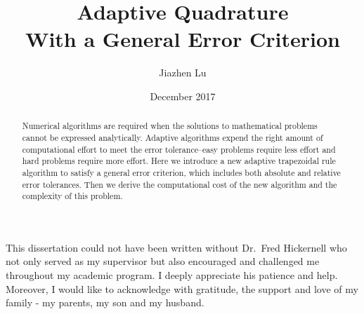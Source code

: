 \documentclass{iitthesis}
\begin{document}
\title{Adaptive Quadrature\\
  With a General Error Criterion}
\author{Jiazhen Lu}
\date{December 2017}
\maketitle                


\prelimpages         


\begin{acknowledgement}    
\par  This dissertation could not have been written without Dr.\  Fred Hickernell who not only served as my supervisor but also encouraged and challenged me throughout my academic program. I deeply appreciate his patience and help. Moreover, I would like to acknowledge with gratitude, the support and love of my family - my parents, my son and my husband. 
\end{acknowledgement}


\tableofcontents
\clearpage

\listoftables

\clearpage

\listoffigures

\clearpage






\begin{abstract}           %

Numerical algorithms are required when the solutions to mathematical problems cannot be expressed analytically. Adaptive algorithms expend the right amount of computational effort to meet the error tolerance--easy problems require less effort and hard problems require more effort. Here we introduce a new adaptive trapezoidal rule algorithm to satisfy a general error criterion, which includes both absolute and relative error tolerances. Then we derive the computational cost of the new algorithm and the complexity of this problem.
\end{abstract}


\textpages     %

\end{document}
